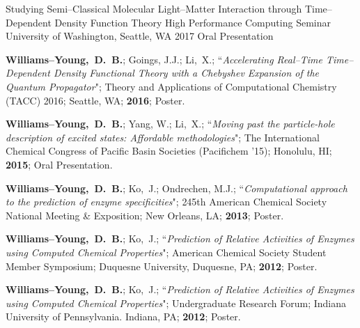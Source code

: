 \documentclass[10pt]{res} %
\newcommand*\me[0]{{\bf Williams--Young,~D.~B.}}
\newcommand*\xsli[0]{Li,~X.}
\newcommand*\ko[0]{Ko,~J.}
\newcommand{\presentation}[6]{%
{#1}; ``\emph{#2}"; {#3}; {#4}; \textbf{#5}; {#6}.%
}
\begin{document}
\begin{resume}
\begin{etaremune}
        {Studying Semi--Classical Molecular Light--Matter Interaction through Time--Dependent Density Function Theory}%
        {High Performance Computing Seminar}%
        {University of Washington, Seattle, WA}%
        {2017}%
        {Oral Presentation} 
  \item \presentation%
        {\me; Goings, J.J.; \xsli}%
        {Accelerating Real--Time Time--Dependent Density Functional Theory with a Chebyshev Expansion of the Quantum Propagator}%
        {Theory and Applications of Computational Chemistry (TACC) 2016}%
        {Seattle, WA}%
        {2016}%
        {Poster} 
  \item \presentation%
        {\me; Yang, W.; \xsli}%
        {Moving past the particle-hole description of excited states: Affordable methodologies}%
        {The International Chemical Congress of Pacific Basin Societies (Pacifichem '15)}%
        {Honolulu, HI}%
        {2015}%
        {Oral Presentation} 
  \item \presentation%
        {\me; \ko; Ondrechen, M.J.}%
        {Computational approach to the prediction of enzyme specificities}%
        {245th American Chemical Society National Meeting \& Exposition}%
        {New Orleans, LA}%
        {2013}%
        {Poster} 
  \item \presentation%
        {\me; \ko}%
        {Prediction of Relative Activities of Enzymes using Computed Chemical Properties}%
        {American Chemical Society Student Member Symposium}%
        {Duquesne University, Duquesne, PA}%
        {2012}%
        {Poster} 
  \item \presentation%
        {\me; \ko}%
        {Prediction of Relative Activities of Enzymes using Computed Chemical Properties}%
        {Undergraduate Research Forum}%
        {Indiana University of Pennsylvania. Indiana, PA}%
        {2012}%
        {Poster} 
\end{etaremune}


\end{resume}
\end{document}
